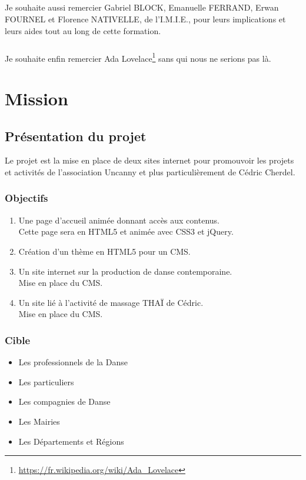 \documentclass[11pt,a4paper,twoside]{report}
\begin{document}
		\paragraph*{}Je souhaite aussi remercier Gabriel BLOCK, Emanuelle FERRAND, Erwan FOURNEL et Florence \linebreak NATIVELLE, de l'I.M.I.E., pour leurs implications et leurs aides tout au long de cette formation.
		\paragraph*{}Je souhaite enfin remercier Ada Lovelace\footnote{\url{https://fr.wikipedia.org/wiki/Ada\_Lovelace}} sans qui nous ne serions pas là.

\chapter{Mission}
	\section{Présentation du projet}
		Le projet est la mise en place de deux sites internet pour promouvoir les projets et activités de l'association Uncanny et plus particulièrement de Cédric Cherdel. 
		\subsection{Objectifs}
			\begin{enumerate}
				\item Une page d'accueil animée donnant accès aux contenus.\\
				Cette page sera en HTML5 et animée avec CSS3 et jQuery.
				\item Création d'un thème en HTML5 pour un CMS.
				\item Un site internet sur la production de danse contemporaine.\\
				Mise en place du CMS.
				\item Un site lié à l'activité de massage THAÏ de Cédric.\\
				Mise en place du CMS.
			\end{enumerate}
		\subsection{Cible}
			\begin{itemize}
				\item Les professionnels de la Danse
				\item Les particuliers
				\item Les compagnies de Danse
				\item Les Mairies
				\item Les Départements et Régions
			\end{itemize}
\end{document}
